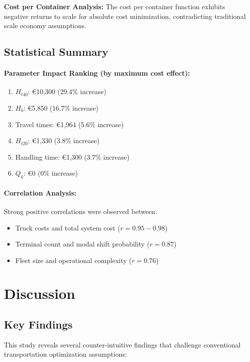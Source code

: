 \documentclass[12pt,a4paper]{article}
\begin{document}
\textbf{Cost per Container Analysis:} The cost per container function exhibits negative returns to scale for absolute cost minimization, contradicting traditional scale economy assumptions.

\subsection{Statistical Summary}

\paragraph{Parameter Impact Ranking (by maximum cost effect):}
\begin{enumerate}
    \item $H_{t40}$: €10,300 (29.4\% increase)
    \item $H_b$: €5,850 (16.7\% increase)
    \item Travel times: €1,964 (5.6\% increase)
    \item $H_{t20}$: €1,330 (3.8\% increase)
    \item Handling time: €1,300 (3.7\% increase)
    \item $Q_k$: €0 (0\% increase)
\end{enumerate}

\paragraph{Correlation Analysis:}
Strong positive correlations were observed between:
\begin{itemize}
    \item Truck costs and total system cost ($r = 0.95-0.98$)
    \item Terminal count and modal shift probability ($r = 0.87$)
    \item Fleet size and operational complexity ($r = 0.76$)
\end{itemize}

\section{Discussion}

\subsection{Key Findings}

This study reveals several counter-intuitive findings that challenge conventional transportation optimization assumptions:
\end{document}
